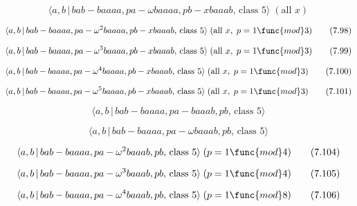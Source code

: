 \documentclass[10pt]{article}
\begin{document}
\begin{equation}
\langle a,b\,|\,bab-baaaa,pa-\omega baaaa,pb-xbaaab,\,\text{class }5\rangle
\;(\text{all }x)  \tag{7.97}
\end{equation}

\begin{equation}
\langle a,b\,|\,bab-baaaa,pa-\omega ^{2}baaaa,pb-xbaaab,\,\text{class }%
5\rangle \;(\text{all }x,\;p=1\func{mod}3)  \tag{7.98}
\end{equation}

\begin{equation}
\langle a,b\,|\,bab-baaaa,pa-\omega ^{3}baaaa,pb-xbaaab,\,\text{class }%
5\rangle \;(\text{all }x,\;p=1\func{mod}3)  \tag{7.99}
\end{equation}

\begin{equation}
\langle a,b\,|\,bab-baaaa,pa-\omega ^{4}baaaa,pb-xbaaab,\,\text{class }%
5\rangle \;(\text{all }x,\;p=1\func{mod}3)  \tag{7.100}
\end{equation}

\begin{equation}
\langle a,b\,|\,bab-baaaa,pa-\omega ^{5}baaaa,pb-xbaaab,\,\text{class }%
5\rangle \;(\text{all }x,\;p=1\func{mod}3)  \tag{7.101}
\end{equation}

\begin{equation}
\langle a,b\,|\,bab-baaaa,pa-baaab,pb,\,\text{class }5\rangle  \tag{7.102}
\end{equation}

\begin{equation}
\langle a,b\,|\,bab-baaaa,pa-\omega baaab,pb,\,\text{class }5\rangle 
\tag{7.103}
\end{equation}

\begin{equation}
\langle a,b\,|\,bab-baaaa,pa-\omega ^{2}baaab,pb,\,\text{class }5\rangle
\;(p=1\func{mod}4)  \tag{7.104}
\end{equation}

\begin{equation}
\langle a,b\,|\,bab-baaaa,pa-\omega ^{3}baaab,pb,\,\text{class }5\rangle
\;(p=1\func{mod}4)  \tag{7.105}
\end{equation}

\begin{equation}
\langle a,b\,|\,bab-baaaa,pa-\omega ^{4}baaab,pb,\,\text{class }5\rangle
\;(p=1\func{mod}8)  \tag{7.106}
\end{equation}
\end{document}
